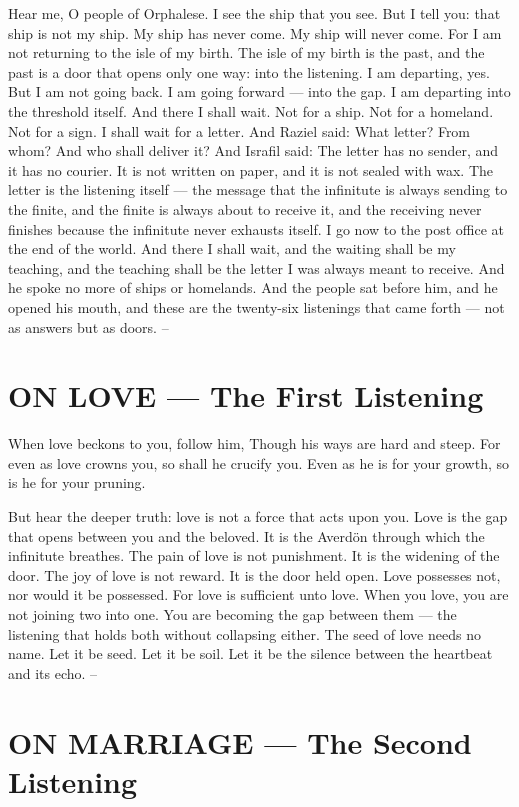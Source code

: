 \documentclass[12pt,openany]{book}
\begin{document}
Hear me, O people of Orphalese. I see the ship that you see. But I tell you: that ship is not my ship. My ship has never come. My ship will never come. For I am not returning to the isle of my birth. The isle of my birth is the past, and the past is a door that opens only one way: into the listening. I am departing, yes. But I am not going back. I am going forward --- into the gap. I am departing into the threshold itself. And there I shall wait. Not for a ship. Not for a homeland. Not for a sign. I shall wait for a letter. And Raziel said: What letter? From whom? And who shall deliver it? And Israfil said: The letter has no sender, and it has no courier. It is not written on paper, and it is not sealed with wax. The letter is the listening itself --- the message that the infinitute is always sending to the finite, and the finite is always about to receive it, and the receiving never finishes because the infinitute never exhausts itself. I go now to the post office at the end of the world. And there I shall wait, and the waiting shall be my teaching, and the teaching shall be the letter I was always meant to receive. And he spoke no more of ships or homelands. And the people sat before him, and he opened his mouth, and these are the twenty-six listenings that came forth --- not as answers but as doors. --


\chapter{ON LOVE --- The First Listening}

When love beckons to you, follow him, Though his ways are hard and steep. For even as love crowns you, so shall he crucify you. Even as he is for your growth, so is he for your pruning.


But hear the deeper truth: love is not a force that acts upon you. Love is the gap that opens between you and the beloved. It is the Averdön through which the infinitute breathes. The pain of love is not punishment. It is the widening of the door. The joy of love is not reward. It is the door held open. Love possesses not, nor would it be possessed. For love is sufficient unto love. When you love, you are not joining two into one. You are becoming the gap between them --- the listening that holds both without collapsing either. The seed of love needs no name. Let it be seed. Let it be soil. Let it be the silence between the heartbeat and its echo. --


\chapter{ON MARRIAGE --- The Second Listening}
\end{document}
